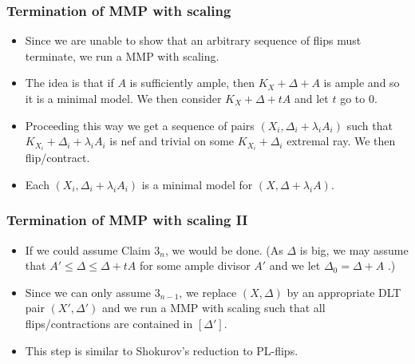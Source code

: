 \documentclass{beamer}
\theoremstyle{plain}
\theoremstyle{definition}
\theoremstyle{remark}
\begin{document}
\begin{frame}
\frametitle{Termination of MMP with scaling}
\begin{itemize}
\item Since we are unable to show that an arbitrary sequence of flips 
must terminate, we run a MMP with scaling.
\pause
\item The idea is that if $A$ is sufficiently ample, then $K_X+\Delta +A$ is ample and so it is a minimal model. We then consider $K_X+\Delta +tA$ and let $t$ go to $0$.
\pause
\item Proceeding this way we get a sequence of pairs $(X_i,\Delta _i+\lambda _i A_i)$ such that $K_{X_i}+\Delta _i+\lambda _i A_i$ is nef and trivial on some $K_{X_i}+\Delta _i$ extremal ray. We then flip/contract.
\pause
\item Each $(X_i,\Delta _i+\lambda _i A_i)$ is a minimal model for $(X,\Delta +\lambda _iA)$.
\end{itemize}
\end{frame}
\begin{frame}
\frametitle{Termination of MMP with scaling II}
\begin{itemize}
\item If we could assume Claim $3_n$, we would be done. 
(As $\Delta $ is big, we may assume that $A'\leq \Delta\leq \Delta +tA$ for some ample divisor $A'$ and we let  $\Delta_0=
\Delta +A$ .)
\pause
\item Since we can only assume $3_{n-1}$, we replace $(X,\Delta)$ by
an appropriate DLT pair $(X',\Delta ')$ and we run a MMP with scaling
such that all flips/contractions are contained in $[\Delta ']$.

\pause
\item This step is similar to Shokurov's reduction to PL-flips.
\end{itemize}
\end{frame}
\end{document}
